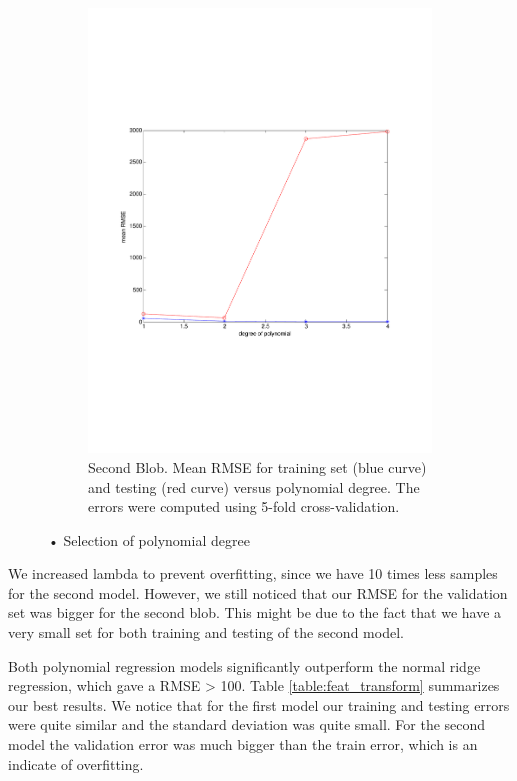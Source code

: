 \documentclass{article} %
\begin{document}
\begin{figure}[h]
\begin{subfigure}[b]{0.45\textwidth}
    \includegraphics[width=\textwidth]{figures/degree_polynomial_blob2_crop.pdf}
    \caption{Second Blob. Mean RMSE for training set (blue curve) and testing (red curve) versus polynomial degree. The errors were computed using 5-fold cross-validation.}
    \label{fig:degre_blob2}
  \end{subfigure}
  \caption{• Selection of polynomial degree}
\end{figure}

We increased lambda to prevent overfitting, since we have 10 times less samples for the second model. However, we still noticed that our RMSE for the validation set  was  bigger for the second blob. This might be due to the fact that we have a very small set for both training and testing of the second model.

Both polynomial regression models significantly outperform the normal ridge regression, which gave a RMSE > 100. Table \ref{table:feat_transform} summarizes our best results. We notice that for the first model our training and testing errors were quite similar and the standard deviation was quite small. For the second model the validation error was much bigger than the train error, which is an indicate of overfitting.
\end{document}
